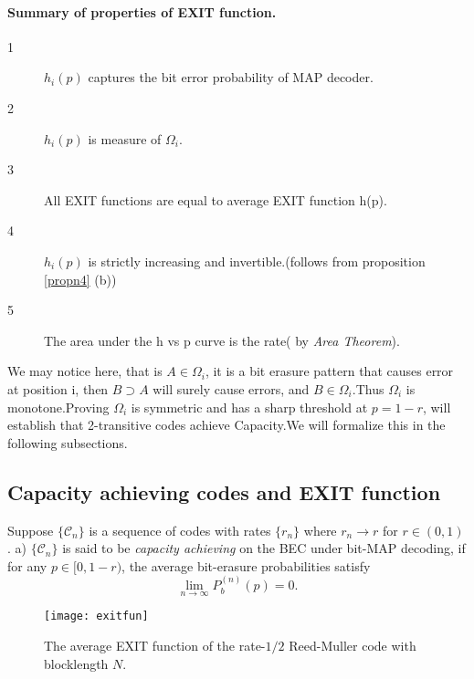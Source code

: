 \documentclass[
10pt, %
a4paper, %
oneside, %
headinclude,footinclude, %
BCOR5mm, %
]{scrartcl}
\begin{document}
\paragraph*{Summary of properties of EXIT function.}
\begin{description}
\item[1] $h_i(p)$ captures the bit error probability of MAP decoder.
\item[2] $h_i(p)$ is measure of $\Omega_i$.
\item[3] All EXIT functions are equal to average EXIT function h(p).
\item[4] $h_i(p)$ is strictly increasing and invertible.(follows from proposition \ref{propn4} (b))
\item[5] The area under the h vs p curve is the rate( by \emph{Area Theorem}).
\end{description}
We may notice here, that is $A\in\Omega_i$, it is a bit erasure pattern that causes error at position i, then $B\supset A$ will surely cause errors, and $B\in\Omega_i$.Thus $\Omega_i$ is monotone.Proving $\Omega_i $ is symmetric and has a sharp threshold at $p=1-r$, will establish that 2-transitive codes achieve Capacity.We will formalize this in the following subsections.

\subsection*{Capacity achieving codes and EXIT function}
\begin{definition}
Suppose $\{\mathcal{C}_n\}$ is a sequence of codes with rates $\{r_n\}$ where $r_n \to r$ for $r \in (0,1)$.
a) $\{\mathcal{C}_n\}$ is said to be \emph{capacity achieving} on the BEC under bit-MAP decoding, if for any $p \in [0, 1-r)$, the average bit-erasure probabilities satisfy $$\lim_{n \to \infty} P_b^{(n)}(p) = 0.$$

\end{definition}
\label{def10}

\begin{figure}[h]
\centering 
\texttt{[image: exitfun]} 
\caption[]{The average EXIT function of the rate-$1/2$ Reed-Muller code with blocklength $N$.} %
\label{fig:exit} 
\end{figure}
\end{document}
